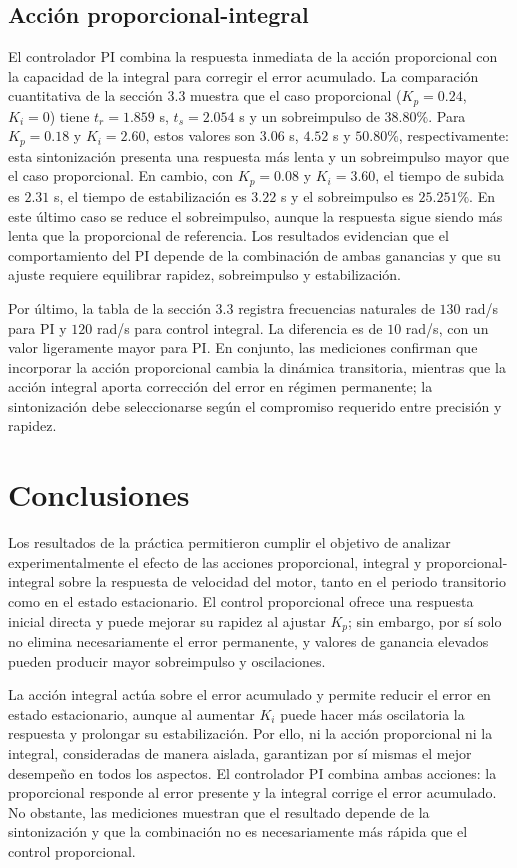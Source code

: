 \documentclass[12pt]{article}
\begin{document}
\subsection{Acci\'on proporcional-integral}
El controlador PI combina la respuesta inmediata de la acci\'on proporcional con la capacidad de la integral para corregir el error acumulado. La comparaci\'on cuantitativa de la secci\'on 3.3 muestra que el caso proporcional ($K_p=0.24$, $K_i=0$) tiene $t_r=1.859$ s, $t_s=2.054$ s y un sobreimpulso de $38.80\%$. Para $K_p=0.18$ y $K_i=2.60$, estos valores son $3.06$ s, $4.52$ s y $50.80\%$, respectivamente: esta sintonizaci\'on presenta una respuesta m\'as lenta y un sobreimpulso mayor que el caso proporcional. En cambio, con $K_p=0.08$ y $K_i=3.60$, el tiempo de subida es $2.31$ s, el tiempo de estabilizaci\'on es $3.22$ s y el sobreimpulso es $25.251\%$. En este \'ultimo caso se reduce el sobreimpulso, aunque la respuesta sigue siendo m\'as lenta que la proporcional de referencia. Los resultados evidencian que el comportamiento del PI depende de la combinaci\'on de ambas ganancias y que su ajuste requiere equilibrar rapidez, sobreimpulso y estabilizaci\'on.

Por \'ultimo, la tabla de la secci\'on 3.3 registra frecuencias naturales de $130$ rad/s para PI y $120$ rad/s para control integral. La diferencia es de $10$ rad/s, con un valor ligeramente mayor para PI. En conjunto, las mediciones confirman que incorporar la acci\'on proporcional cambia la din\'amica transitoria, mientras que la acci\'on integral aporta correcci\'on del error en r\'egimen permanente; la sintonizaci\'on debe seleccionarse seg\'un el compromiso requerido entre precisi\'on y rapidez.

\newpage

\section{Conclusiones}
Los resultados de la pr\'actica permitieron cumplir el objetivo de analizar experimentalmente el efecto de las acciones proporcional, integral y proporcional-integral sobre la respuesta de velocidad del motor, tanto en el periodo transitorio como en el estado estacionario. El control proporcional ofrece una respuesta inicial directa y puede mejorar su rapidez al ajustar $K_p$; sin embargo, por s\'i solo no elimina necesariamente el error permanente, y valores de ganancia elevados pueden producir mayor sobreimpulso y oscilaciones.

La acci\'on integral act\'ua sobre el error acumulado y permite reducir el error en estado estacionario, aunque al aumentar $K_i$ puede hacer m\'as oscilatoria la respuesta y prolongar su estabilizaci\'on. Por ello, ni la acci\'on proporcional ni la integral, consideradas de manera aislada, garantizan por s\'i mismas el mejor desempe\~no en todos los aspectos. El controlador PI combina ambas acciones: la proporcional responde al error presente y la integral corrige el error acumulado. No obstante, las mediciones muestran que el resultado depende de la sintonizaci\'on y que la combinaci\'on no es necesariamente m\'as r\'apida que el control proporcional.
\end{document}
